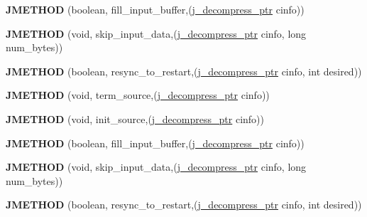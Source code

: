 \begin{DoxyCompactItemize}
{\bfseries J\+M\+E\+T\+H\+OD} (boolean, fill\+\_\+input\+\_\+buffer,(\hyperlink{structjpeg__decompress__struct}{j\+\_\+decompress\+\_\+ptr} cinfo))
\item 
\mbox{\label{structjpeg__source__mgr_a3e29df8ddadb0c15e54b69b5a7a10305}} 
{\bfseries J\+M\+E\+T\+H\+OD} (void, skip\+\_\+input\+\_\+data,(\hyperlink{structjpeg__decompress__struct}{j\+\_\+decompress\+\_\+ptr} cinfo, long num\+\_\+bytes))
\item 
\mbox{\label{structjpeg__source__mgr_a60a35ccd1fb8d954f34c0cdbf29ac010}} 
{\bfseries J\+M\+E\+T\+H\+OD} (boolean, resync\+\_\+to\+\_\+restart,(\hyperlink{structjpeg__decompress__struct}{j\+\_\+decompress\+\_\+ptr} cinfo, int desired))
\item 
\mbox{\label{structjpeg__source__mgr_a6c0683ce1166b9ee659b2d3aa1efb1c2}} 
{\bfseries J\+M\+E\+T\+H\+OD} (void, term\+\_\+source,(\hyperlink{structjpeg__decompress__struct}{j\+\_\+decompress\+\_\+ptr} cinfo))
\item 
\mbox{\label{structjpeg__source__mgr_af8fda02c19c9dc4e505daabb77c3ad81}} 
{\bfseries J\+M\+E\+T\+H\+OD} (void, init\+\_\+source,(\hyperlink{structjpeg__decompress__struct}{j\+\_\+decompress\+\_\+ptr} cinfo))
\item 
\mbox{\label{structjpeg__source__mgr_ab4a579b1f50108e2de73c7c0c1bbb9fd}} 
{\bfseries J\+M\+E\+T\+H\+OD} (boolean, fill\+\_\+input\+\_\+buffer,(\hyperlink{structjpeg__decompress__struct}{j\+\_\+decompress\+\_\+ptr} cinfo))
\item 
\mbox{\label{structjpeg__source__mgr_a3e29df8ddadb0c15e54b69b5a7a10305}} 
{\bfseries J\+M\+E\+T\+H\+OD} (void, skip\+\_\+input\+\_\+data,(\hyperlink{structjpeg__decompress__struct}{j\+\_\+decompress\+\_\+ptr} cinfo, long num\+\_\+bytes))
\item 
\mbox{\label{structjpeg__source__mgr_a60a35ccd1fb8d954f34c0cdbf29ac010}} 
{\bfseries J\+M\+E\+T\+H\+OD} (boolean, resync\+\_\+to\+\_\+restart,(\hyperlink{structjpeg__decompress__struct}{j\+\_\+decompress\+\_\+ptr} cinfo, int desired))
\item 

\end{DoxyCompactItemize}
